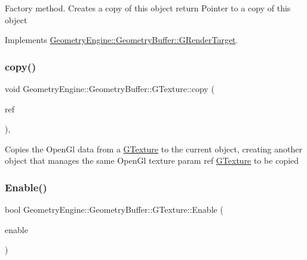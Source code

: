 Factory method. Creates a copy of this object return Pointer to a copy of this object 

Implements \mbox{\hyperlink{class_geometry_engine_1_1_geometry_buffer_1_1_g_render_target_a3b14d8929cf9d2acb6bc263c709ff019}{Geometry\+Engine\+::\+Geometry\+Buffer\+::\+G\+Render\+Target}}.

\mbox{\label{class_geometry_engine_1_1_geometry_buffer_1_1_g_texture_aff15a7cb82c8cd1ecf8654e9e62df62e}} 
\subsubsection{\texorpdfstring{copy()}{copy()}}
{\footnotesize\ttfamily void Geometry\+Engine\+::\+Geometry\+Buffer\+::\+G\+Texture\+::copy (\begin{DoxyParamCaption}\item[{const \mbox{\hyperlink{class_geometry_engine_1_1_geometry_buffer_1_1_g_texture}{G\+Texture}} \&}]{ref }\end{DoxyParamCaption})\hspace{0.3cm}{\ttfamily [protected]}, {\ttfamily [virtual]}}

Copies the Open\+Gl data from a \mbox{\hyperlink{class_geometry_engine_1_1_geometry_buffer_1_1_g_texture}{G\+Texture}} to the current object, creating another object that manages the same Open\+Gl texture param ref \mbox{\hyperlink{class_geometry_engine_1_1_geometry_buffer_1_1_g_texture}{G\+Texture}} to be copied \mbox{\label{class_geometry_engine_1_1_geometry_buffer_1_1_g_texture_a528604f22629785271b3f36ec18ffc78}} 
\subsubsection{\texorpdfstring{Enable()}{Enable()}}
{\footnotesize\ttfamily bool Geometry\+Engine\+::\+Geometry\+Buffer\+::\+G\+Texture\+::\+Enable (\begin{DoxyParamCaption}\item[{bool}]{enable }\end{DoxyParamCaption})\hspace{0.3cm}{\ttfamily [virtual]}}

